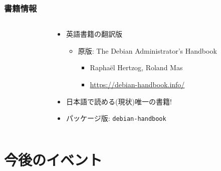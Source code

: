 \documentclass[cjk,c,squeeze,shrink,dvipdfmx,12pt]{beamer}
\begin{document}
\begin{frame}
  \frametitle{書籍情報}
  \begin{columns}
    \begin{column}{.45\paperwidth}
      \centering
    \end{column}
    \begin{column}{.54\paperwidth}
      \begin{itemize}
      \item %
        英語書籍の翻訳版
        \begin{itemize}
        \item %
          原版: The Debian Administrator's Handbook
          \begin{itemize}
          \item %
            Rapha\"el Hertzog, Roland Mas
          \item \url{https://debian-handbook.info/}
          \end{itemize}
        \end{itemize}
      \item %
        日本語で読める(現状)唯一の書籍!
      \item %
        パッケージ版:
        \texttt{debian-handbook}
      \end{itemize}
    \end{column}
  \end{columns}
\end{frame}


\iffalse
\section{今後のイベント}

\end{document}
